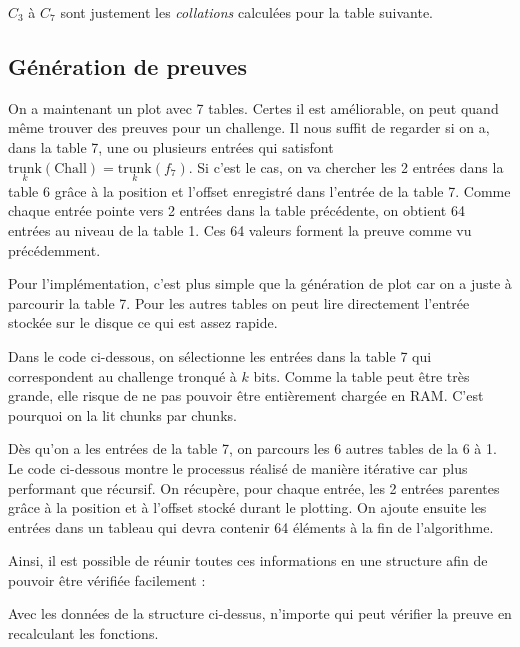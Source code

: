 $C_3$ à $C_7$ sont justement les \emph{collations} calculées pour la table suivante.

\subsection{Génération de preuves}

On a maintenant un plot avec 7 tables. Certes il est améliorable, on peut quand même trouver des preuves pour un challenge. Il nous suffit de regarder si on a, dans la table 7, une ou plusieurs entrées qui satisfont $\underset{k}{\mathrm{trunk}}(\mathrm{Chall})=\underset{k}{\mathrm{trunk}}(f_7)$. Si c'est le cas, on va chercher les 2 entrées dans la table 6 grâce à la position et l'offset enregistré dans l'entrée de la table 7. Comme chaque entrée pointe vers 2 entrées dans la table précédente, on obtient 64 entrées au niveau de la table 1. Ces 64 valeurs forment la preuve comme vu précédemment.

Pour l'implémentation, c'est plus simple que la génération de plot car on a juste à parcourir la  table 7. Pour les autres tables on peut lire directement l'entrée stockée sur le disque ce qui est assez rapide.

Dans le code ci-dessous, on sélectionne les entrées dans la table 7 qui correspondent au challenge tronqué à $k$ bits. Comme la table peut être très grande, elle risque de ne pas pouvoir être entièrement chargée en RAM. C'est pourquoi on la lit chunks par chunks.


Dès qu'on a les entrées de la table 7, on parcours les 6 autres tables de la 6 à 1. Le code ci-dessous montre le processus réalisé de manière itérative car plus performant que récursif. On récupère, pour chaque entrée, les 2 entrées parentes grâce à la position et à l'offset stocké durant le plotting. On ajoute ensuite les entrées dans un tableau qui devra contenir 64 éléments à la fin de l'algorithme.


Ainsi, il est possible de réunir toutes ces informations en une structure afin de pouvoir être vérifiée facilement :


Avec les données de la structure ci-dessus, n'importe qui peut vérifier la preuve en recalculant les fonctions.

